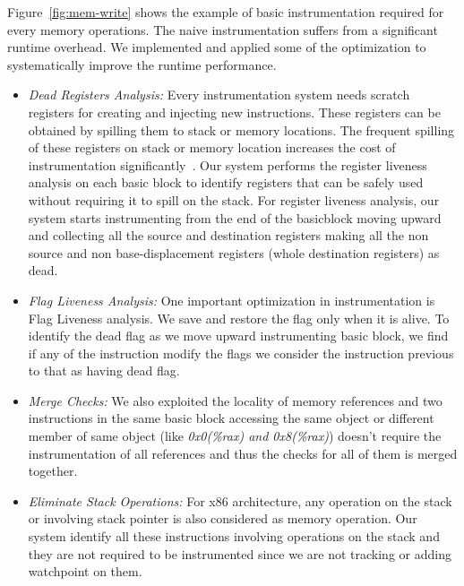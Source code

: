 Figure~\ref{fig:mem-write} shows the example of basic instrumentation required for every memory operations. The naive instrumentation suffers from a significant runtime overhead. We implemented and applied some of the optimization to systematically improve the runtime performance. %
\begin{itemize}
	\item \emph{Dead Registers Analysis:} Every instrumentation system needs scratch registers for creating and injecting new instructions. These registers can be obtained by spilling them to stack or memory locations. %
The frequent spilling of these registers on stack or memory location increases the cost of instrumentation significantly~\cite{Probst02registerliveness, Muth98registerliveness}. Our system performs the register liveness analysis on each basic block to identify registers that can be safely used without requiring it to spill on the stack. For register liveness analysis, our system starts instrumenting from the end of the basicblock moving upward and collecting all the source and destination registers making all the non source and non base-displacement registers (whole destination registers) as dead.  
	\item \emph{Flag Liveness Analysis:} %
One important optimization in instrumentation is Flag Liveness analysis. We save and restore the flag only when it is alive. To identify the dead flag as we move upward instrumenting basic block, we find if any of the instruction modify the flags we consider the instruction previous to that as having dead flag. 
	\item \emph{Merge Checks:} We also exploited the locality of memory references and two instructions in the same basic block accessing the same object or different member of same object (like \emph{0x0(\%rax) and 0x8(\%rax)}) doesn’t require the instrumentation of all references and thus the checks for all of them is merged together.
    \item \emph{Eliminate Stack Operations:} For x86 architecture, any operation on the stack or involving stack pointer is also considered as memory operation. Our system identify all these instructions involving operations on the stack and they are not required to be instrumented since we are not tracking or adding watchpoint on them.
\end{itemize}

